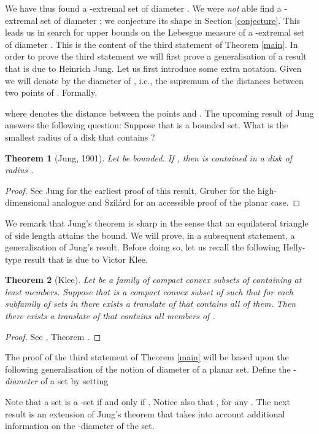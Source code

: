 \documentclass[12pt]{article}
\newtheorem{thm}{Theorem}[section]
\begin{document}
We have thus found a -extremal set of diameter . 
We were \emph{not} able find a -extremal set of diameter ; we conjecture 
its shape in Section \ref{conjecture}. This leads us in search for upper bounds on 
the Lebesgue measure of a -extremal set of diameter . 
This is the content of the third statement of Theorem \ref{main}.
In order to prove the third statement we will first prove a generalisation of a result that is due to Heinrich Jung. 
Let us first introduce some extra notation. Given  we will denote by 
 the 
diameter of , i.e., the supremum of the distances between two points of . Formally, 
 
where  denotes the distance between the points  and . 
The upcoming result of Jung answers the following question: Suppose that 
 is 
a bounded set. What is the smallest radius of a disk that contains ? 

\begin{thm}[Jung, 1901] Let  be bounded. If ,
then  is contained in a disk of radius .
\end{thm}
\begin{proof} See Jung \cite{Jung} for the earliest proof of this result, Gruber \cite{Gruber} for the 
high-dimensional 
analogue and  Szil\'ard \cite{Szilard} for an accessible proof of the planar case.
\end{proof}

We remark that Jung's theorem is sharp in the sense that an equilateral triangle of side length  
attains the bound.
We will prove, in a subsequent statement, a generalisation of Jung's result. Before doing so, let us 
recall  the following Helly-type result that is due to Victor Klee.

\begin{thm}[Klee]
\label{Klee} Let  be a family of compact convex subsets of  containing at 
least  members. Suppose that  is a compact convex subset of  such that 
for each subfamily of  sets in  there exists a translate of  that contains all  of them.
Then there exists a translate of  that contains all members of .
\end{thm}
\begin{proof} See \cite{Lay}, Theorem .
\end{proof}

The proof of the third statement of Theorem \ref{main} will be based upon the following 
generalisation of the notion of diameter of a planar set.
Define the -\emph{diameter} of a set  by setting

Note that a set 
is a  -set if and only if . Notice also that 
, for any .
The next result is an extension of Jung's theorem  
that takes into account additional information on the -diameter of the set.
\end{document}
